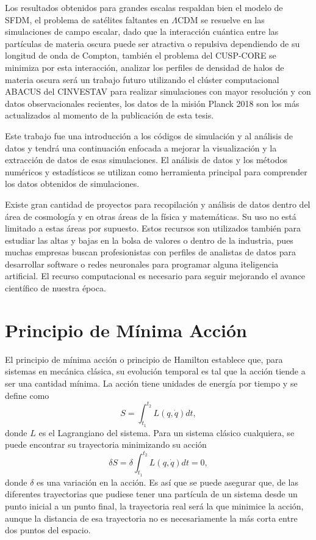 \documentclass[a4paper,openright,10pt, oneside, final]{book}
\begin{document}
Los resultados obtenidos para grandes escalas respaldan bien el modelo de SFDM, el problema de satélites faltantes en $\Lambda$CDM se resuelve en las simulaciones de campo escalar, dado que la interacción cuántica entre las partículas de materia oscura puede ser atractiva o repulsiva dependiendo de su longitud de onda de Compton, también el problema del CUSP-CORE se minimiza por esta interacción, analizar los perfiles de densidad de halos de materia oscura será un trabajo futuro utilizando el clúster computacional ABACUS del CINVESTAV para realizar simulaciones con mayor resolución y con datos observacionales recientes, los datos de la misión Planck 2018 son los más actualizados al momento de la publicación de esta tesis.

Este trabajo fue una introducción a los códigos de simulación y al análisis de datos y tendrá una continuación enfocada a mejorar la visualización y la extracción de datos de esas simulaciones. El análisis de datos y los métodos numéricos y estadísticos se utilizan como herramienta principal para comprender los datos obtenidos de simulaciones. 

Existe gran cantidad de proyectos para recopilación y análisis de datos dentro del área de cosmología y en otras áreas de la física y matemáticas. Su uso no está limitado a estas áreas por supuesto. Estos recursos son utilizados también para estudiar las altas y bajas en la bolsa de valores o dentro de la industria, pues muchas empresas buscan profesionistas con perfiles de analistas de datos para desarrollar software o redes neuronales para programar alguna iteligencia artificial. El recurso computacional es necesario para seguir mejorando el avance científico de nuestra época.



 
\appendix 

\chapter{Principio de Mínima Acción}\label{Apend. A}
El principio de mínima acción o principio de Hamilton establece que, para sistemas en mecánica clásica, su evolución temporal es tal que la acción tiende a ser una cantidad mínima. La acción tiene unidades de energía por tiempo y se define como 
\begin{equation}
S = \int_{t_{1}}^{t_{2}}L(q,\dot{q})dt,\label{A1}
\end{equation}
donde $L$ es el Lagrangiano del sistema. Para un sistema clásico cualquiera, se puede encontrar su trayectoria minimizando su acción
\begin{equation}
\delta S = \delta \int_{t_{1}}^{t_{2}}L(q,\dot{q})dt = 0,\label{A2}
\end{equation} 
donde $\delta$ es una variación en la acción. Es así que se puede asegurar que, de las diferentes trayectorias que pudiese tener una partícula de un sistema desde un punto inicial a un punto final, la trayectoria real será la que minimice la acción, aunque la distancia de esa trayectoria no es necesariamente la más corta entre dos puntos del espacio.
\end{document}
